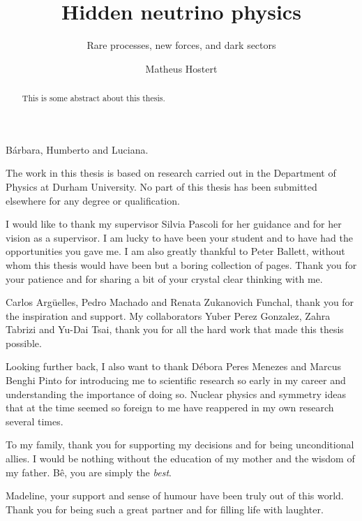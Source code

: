 \documentclass[openany,twoside,frontopenright,chaprunninghead]{ip3thesis}
\begin{document}
\title{Hidden neutrino physics}
\subtitle{Rare processes, new forces, and dark sectors}
\author{Matheus Hostert}
\maketitlepage*

\begin{abstract}
%
	This is some abstract about this thesis.
%
\end{abstract}


\begin{dedication*}
%
B\'arbara, Humberto and Luciana.
%
\end{dedication*}

\disableprotrusion
\tableofcontents*
\listoffigures
\listoftables
\enableprotrusion

\begin{declaration*}
%
	The work in this thesis is based on research carried out in the Department of
	Physics at Durham University. No part of this thesis has been
	submitted elsewhere for any degree or qualification.
%
\end{declaration*}

\begin{acknowledgements*}

	I would like to thank my supervisor Silvia Pascoli for her guidance and for her vision as a supervisor. I am lucky to have been your student and to have had the opportunities you gave me. I am also greatly thankful to Peter Ballett, without whom this thesis would have been but a boring collection of pages. Thank you for your patience and for sharing a bit of your crystal clear thinking with me.
	
	\vspace{2ex}
	Carlos Arg\"uelles, Pedro Machado and Renata Zukanovich Funchal, thank you for the inspiration and support. My collaborators Yuber Perez Gonzalez, Zahra Tabrizi and Yu-Dai Tsai, thank you for all the hard work that made this thesis possible.

	\vspace{2ex}
	Looking further back, I also want to thank D\'ebora Peres Menezes and Marcus Benghi Pinto for introducing me to scientific research so early in my career and understanding the importance of doing so. Nuclear physics and symmetry ideas that at the time seemed so foreign to me have reappered in my own research several times.
	
	\vspace{2ex}
	To my family, thank you for supporting my decisions and for being unconditional allies. I would be nothing without the education of my mother and the wisdom of my father. B\^e, you are simply the \emph{best}.
	
	\vspace{2ex}
	Madeline, your support and sense of humour have been truly out of this world. Thank you for being such a great partner and for filling life with laughter.
	
\end{acknowledgements*}
\end{document}
